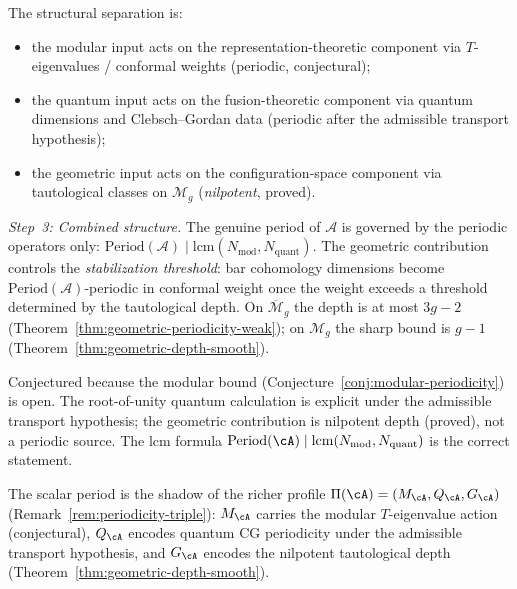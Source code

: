 \begin{evidence}
The structural separation is:
\begin{itemize}
\item the modular input acts on the representation-theoretic component
 via $T$-eigenvalues / conformal weights (periodic, conjectural);
\item the quantum input acts on the fusion-theoretic component via
 quantum dimensions and Clebsch--Gordan data (periodic after the
 admissible transport hypothesis);
\item the geometric input acts on the configuration-space component via
 tautological classes on $\mathcal{M}_g$ (\emph{nilpotent}, proved).
\end{itemize}

\emph{Step~3: Combined structure.}
The genuine period of $\mathcal{A}$ is governed by the periodic
operators only:
$\mathrm{Period}(\mathcal{A}) \mid \mathrm{lcm}(N_{\mathrm{mod}},
N_{\mathrm{quant}})$. The geometric contribution controls
the \emph{stabilization threshold}: bar cohomology dimensions
become $\mathrm{Period}(\mathcal{A})$-periodic in conformal weight
once the weight exceeds a threshold determined by the tautological
depth. On $\overline{\mathcal{M}}_g$ the depth is at most $3g-2$
(Theorem~\ref{thm:geometric-periodicity-weak}); on $\mathcal{M}_g$
the sharp bound is $g-1$
(Theorem~\ref{thm:geometric-depth-smooth}).
\end{evidence}

\begin{remark}[Scope]\label{rem:periodicity-classification-scope}
Conjectured because the modular bound
(Conjecture~\ref{conj:modular-periodicity}) is open. The
root-of-unity quantum calculation is explicit under the admissible
transport hypothesis; the geometric contribution is nilpotent depth
(proved), not a periodic source. The lcm formula
$\mathrm{Period}(\cA) \mid
\mathrm{lcm}(N_{\mathrm{mod}}, N_{\mathrm{quant}})$ is the correct
statement.
\end{remark}

\begin{remark}\label{rem:periodicity-triple-deformation}
The scalar period is the shadow of the richer profile
$\Pi(\cA) = (M_\cA, Q_\cA, G_\cA)$
(Remark~\ref{rem:periodicity-triple}):
$M_\cA$ carries the modular $T$-eigenvalue action (conjectural),
$Q_\cA$ encodes quantum CG periodicity under the admissible transport
hypothesis, and $G_\cA$
encodes the nilpotent tautological depth
(Theorem~\ref{thm:geometric-depth-smooth}).
\end{remark}

